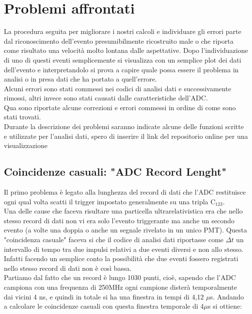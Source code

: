 \documentclass[a4paper]{article}
\begin{document}
\section{Problemi affrontati}
\label{secA:ProblemiADC}
La procedura seguita per migliorare i nostri calcoli e individuare gli errori parte dal riconoscimento dell'evento presumibilmente ricostruito male o che riporta come risultato una velocità molto lontana dalle aspettative. Dopo l'individuazione di uno di questi eventi semplicemente si visualizza con un semplice plot dei dati dell'evento e interpretandolo si prova a capire quale possa essere il problema in analisi o in presa dati che ha portato a quell'errore.\\
Alcuni errori sono stati commessi nei codici di analisi dati e successivamente rimossi, altri invece sono stati causati dalle caratteristiche dell'ADC.\\
Qua sono riportate alcune correzioni e errori commessi in ordine di come sono stati trovati.\\
Durante la descrizione dei problemi saranno indicate alcune delle funzioni scritte e utilizzate per l'analisi dati, spero di inserire il link del repositorio online per una visualizzazione

\subsection{Coincidenze casuali: "ADC Record Lenght"}
\label{secA:RecLenght}
Il primo problema è legato alla lunghezza del record di dati che l'ADC restituisce ogni qual volta scatti il trigger impostato generalmente su una tripla C$_{123}$.\\
Una delle cause che faceva risultare una particella ultrarelativistica era che nello stesso record di dati non vi era solo l'evento triggerante ma anche un secondo evento (a volte una doppia o anche un segnale rivelato in un unico PMT). Questa "coincidenza casuale" faceva si che il codice di analisi dati riportasse come $\Delta t$ un intervallo di tempo tra due impulsi relativi a due eventi diversi e non allo stesso.\\
Infatti facendo un semplice conto la possibilità che due eventi fossero registrati nello stesso record di dati non è così bassa.\\
Partiamo dal fatto che un record è lungo 1030 punti, cioè, sapendo che l'ADC campiona con una frequenza di 250MHz ogni campione disterà temporalmente dai vicini 4 ns, e quindi in totale si ha una finestra in tempi di 4,12 $\mu$s. Andando a calcolare le coincidenze casuali con questa finestra temporale di 4$\mu$s si ottiene:
\end{document}

